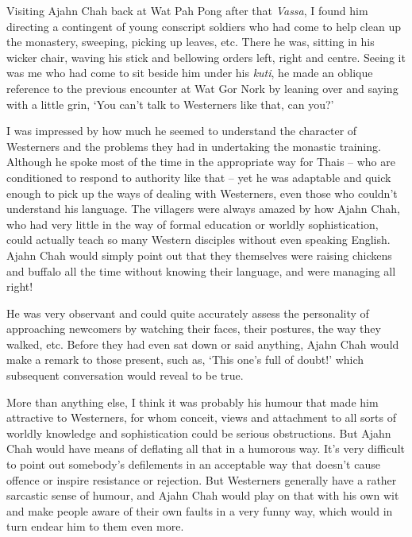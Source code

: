 Visiting Ajahn Chah back at Wat Pah Pong after that \emph{Vassa}, I
found him directing a contingent of young conscript soldiers who had
come to help clean up the monastery, sweeping, picking up leaves, etc.
There he was, sitting in his wicker chair, waving his stick and
bellowing orders left, right and centre. Seeing it was me who had come
to sit beside him under his \emph{kuti}, he made an oblique reference to
the previous encounter at Wat Gor Nork by leaning over and saying with a
little grin, `You can't talk to Westerners like that, can you?'

I was impressed by how much he seemed to understand the character of
Westerners and the problems they had in undertaking the monastic
training. Although he spoke most of the time in the appropriate way for
Thais -- who are conditioned to respond to authority like that -- yet he
was adaptable and quick enough to pick up the ways of dealing with
Westerners, even those who couldn't understand his language. The
villagers were always amazed by how Ajahn Chah, who had very little in
the way of formal education or worldly sophistication, could actually
teach so many Western disciples without even speaking English. Ajahn
Chah would simply point out that they themselves were raising chickens
and buffalo all the time without knowing their language, and were
managing all right!

He was very observant and could quite accurately assess the personality
of approaching newcomers by watching their faces, their postures, the
way they walked, etc. Before they had even sat down or said anything,
Ajahn Chah would make a remark to those present, such as, `This one's
full of doubt!' which subsequent conversation would reveal to be true.

More than anything else, I think it was probably his humour that made
him attractive to Westerners, for whom conceit, views and attachment to
all sorts of worldly knowledge and sophistication could be serious
obstructions. But Ajahn Chah would have means of deflating all that in a
humorous way. It's very difficult to point out somebody's defilements in
an acceptable way that doesn't cause offence or inspire resistance or
rejection. But Westerners generally have a rather sarcastic sense of
humour, and Ajahn Chah would play on that with his own wit and make
people aware of their own faults in a very funny way, which would in
turn endear him to them even more.

